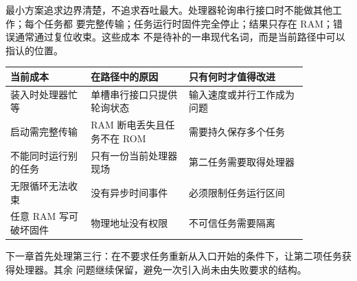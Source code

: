 最小方案追求边界清楚，不追求吞吐最大。处理器轮询串行接口时不能做其他工作；每个任务都
要完整传输；任务运行时固件完全停止；结果只存在 RAM；错误通常通过复位收束。这些成本
不是待补的一串现代名词，而是当前路径中可以指认的位置。

\begin{longtable}{|L{0.23\linewidth}|L{0.29\linewidth}|L{0.34\linewidth}|}
\hline
{}
当前成本 & 在路径中的原因 & 只有何时才值得改进 \\ \hline
装入时处理器忙等 & 单槽串行接口只提供轮询状态 & 输入速度或并行工作成为问题 \\ \hline
启动需完整传输 & RAM 断电丢失且任务不在 ROM & 需要持久保存多个任务 \\ \hline
不能同时运行别的任务 & 只有一份当前处理器现场 & 第二任务需要取得处理器 \\ \hline
无限循环无法收束 & 没有异步时间事件 & 必须限制任务运行区间 \\ \hline
任意 RAM 写可破坏固件 & 物理地址没有权限 & 不可信任务需要隔离 \\ \hline
\end{longtable}

下一章首先处理第三行：在不要求任务重新从入口开始的条件下，让第二项任务获得处理器。其余
问题继续保留，避免一次引入尚未由失败要求的结构。
